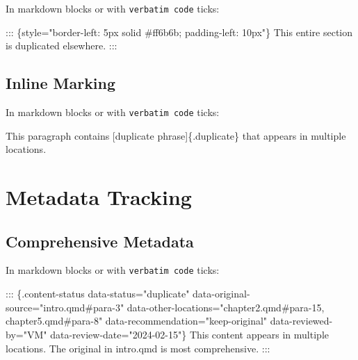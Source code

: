 \documentclass[
  11pt,
  letterpaper,
]{book}
\newenvironment{Shaded}{\begin{snugshade}}{\end{snugshade}}
\newcommand{\CommentTok}[1]{\textcolor[rgb]{0.37,0.37,0.37}{#1}}
\newcommand{\NormalTok}[1]{\textcolor[rgb]{0.00,0.23,0.31}{#1}}
\newcommand{\OtherTok}[1]{\textcolor[rgb]{0.00,0.23,0.31}{#1}}
\begin{document}
In markdown blocks or with \texttt{verbatim\ code} ticks:

\begin{Shaded}
\begin{Highlighting}[]
\NormalTok{::: \{style="border{-}left: 5px solid \#ff6b6b; padding{-}left: 10px"\}}
\NormalTok{This entire section is duplicated elsewhere.}
\NormalTok{:::}
\end{Highlighting}
\end{Shaded}

\subsection*{Inline Marking}\label{inline-marking}

In markdown blocks or with \texttt{verbatim\ code} ticks:

\begin{Shaded}
\begin{Highlighting}[]
\NormalTok{This paragraph contains }\CommentTok{[}\OtherTok{duplicate phrase}\CommentTok{]}\NormalTok{\{.duplicate\} that appears }
\NormalTok{in multiple locations.}
\end{Highlighting}
\end{Shaded}

\section*{Metadata Tracking}\label{metadata-tracking}


\subsection*{Comprehensive Metadata}\label{comprehensive-metadata}

In markdown blocks or with \texttt{verbatim\ code} ticks:

\begin{Shaded}
\begin{Highlighting}[]
\NormalTok{::: \{.content{-}status }
\NormalTok{     data{-}status="duplicate"}
\NormalTok{     data{-}original{-}source="intro.qmd\#para{-}3"}
\NormalTok{     data{-}other{-}locations="chapter2.qmd\#para{-}15, chapter5.qmd\#para{-}8"}
\NormalTok{     data{-}recommendation="keep{-}original"}
\NormalTok{     data{-}reviewed{-}by="VM"}
\NormalTok{     data{-}review{-}date="2024{-}02{-}15"\}}
\NormalTok{This content appears in multiple locations.}
\NormalTok{The original in intro.qmd is most comprehensive.}
\NormalTok{:::}
\end{Highlighting}
\end{Shaded}
\end{document}
